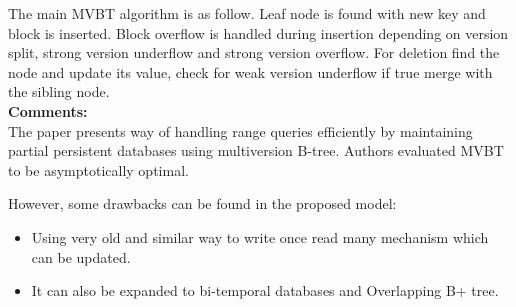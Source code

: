 \documentclass[a4paper,12pt, twoside]{article}
\begin{document}
The main MVBT algorithm is as follow. Leaf node is found with new key and block is inserted. Block overflow is handled during insertion depending on version split, strong version underflow and strong version overflow. For deletion find the node and update its value, check for weak version underflow if true merge with the sibling node.\\

  
\textbf{Comments:}\\
The paper presents way of handling range queries efficiently by maintaining partial persistent databases using multiversion B-tree. Authors evaluated MVBT to be asymptotically optimal.  

However, some drawbacks can be found in the proposed model:
\begin{itemize}
	\item Using very old and similar way to write once read many mechanism which can be updated.
	\item It can also be expanded to bi-temporal databases and Overlapping B+ tree.
\end{itemize}
\end{document}
